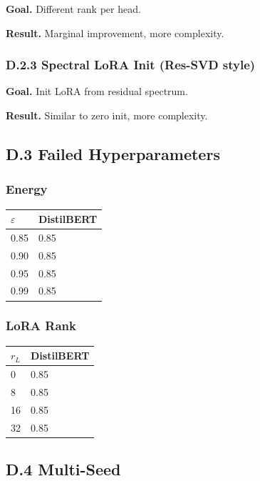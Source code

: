 \textbf{Goal.} Different rank per head.

\textbf{Result.} Marginal improvement, more complexity.

\subsubsection{D.2.3 Spectral LoRA Init (Res-SVD style)}

\textbf{Goal.} Init LoRA from residual spectrum.

\textbf{Result.} Similar to zero init, more complexity.

\subsection{D.3 Failed Hyperparameters}

\subsubsection{Energy}

\begin{table}[H]
\centering
\small
\begin{tabular}{ll}
\toprule
\textbf{$\varepsilon$} & \textbf{DistilBERT} \\
\midrule
0.85 & 0.85 \\
0.90 & 0.85 \\
0.95 & 0.85 \\
0.99 & 0.85 \\
\bottomrule
\end{tabular}
\end{table}

\subsubsection{LoRA Rank}

\begin{table}[H]
\centering
\small
\begin{tabular}{ll}
\toprule
\textbf{$r_L$} & \textbf{DistilBERT} \\
\midrule
0 & 0.85 \\
8 & 0.85 \\
16 & 0.85 \\
32 & 0.85 \\
\bottomrule
\end{tabular}
\end{table}

\subsection{D.4 Multi-Seed}

